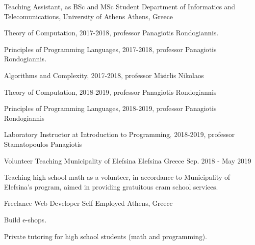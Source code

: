\begin{cventries}
  \cventry
    {Teaching Assistant, as BSc and MSc Student} %
    {Department of Informatics and Telecomunications, University of Athens} %
    {Athens, Greece} %
    {} %
    {
      \begin{cvitems} %
        \item {Theory of Computation, 2017-2018, professor Panagiotis Rondogiannis.}
        \item {Principles of Programming Languages, 2017-2018, professor Panagiotis Rondogiannis.}
        \item {Algorithms and Complexity, 2017-2018, professor Misirlis Nikolaos      }
        \item {Theory of Computation, 2018-2019, professor Panagiotis Rondogiannis
        }
        \item {Principles of Programming Languages, 2018-2019, professor Panagiotis Rondogiannis
        }
	    \item {Laboratory Instructor at Introduction to Programming, 2018-2019, professor Stamatopoulos Panagiotis
	    }
      \end{cvitems}
    }



  \cventry
    {Volunteer Teaching} %
    {Municipality of Elefsina} %
    {Elefsina Greece} %
    {Sep. 2018 - May 2019} %
    {
      \begin{cvitems} %
        \item {Teaching high school math as a volunteer, in accordance to Municipality of Elefsina's program, aimed in providing gratuitous cram school services.}
      \end{cvitems}
    }

\cventry
{Freelance Web Developer} %
{Self Employed} %
{Athens, Greece} %
{} %
{
	\begin{cvitems} %
		\item {Build e-shops.}
		\item {Private tutoring for high school students (math and programming).}
	\end{cvitems}	
}

\end{cventries}
